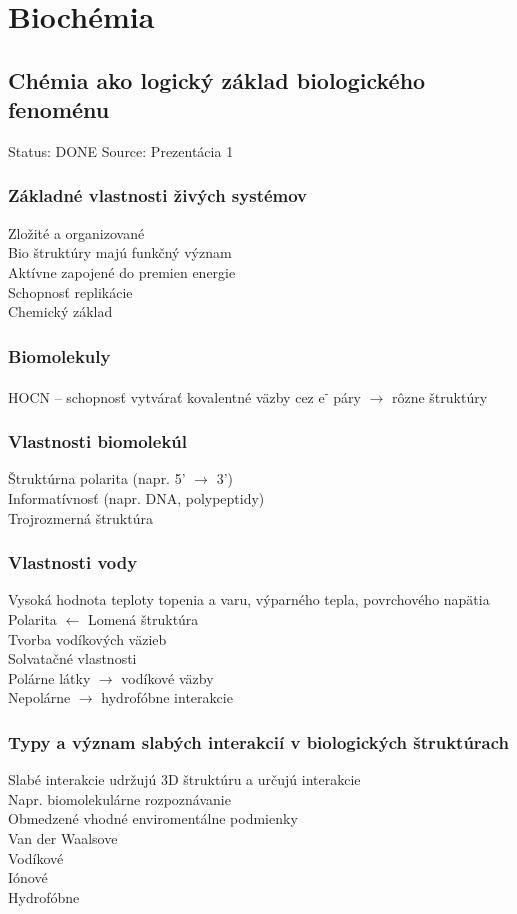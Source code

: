 \newcommand\tab[1][1cm]{\hspace*{#1}}
\chapter[Biochémia]{Biochémia}
\label{biochemia} %

\section{Chémia ako logický základ biologického fenoménu}
Status: DONE
Source: Prezentácia 1
\\
\subsection*{Základné vlastnosti živých systémov}
Zložité a organizované\\
Bio štruktúry majú funkčný význam\\
Aktívne zapojené do premien energie\\
Schopnosť replikácie\\
Chemický základ
\subsection*{Biomolekuly}
HOCN -- schopnosť vytvárať kovalentné väzby cez e\textsuperscript{-} páry $\rightarrow$ rôzne štruktúry
\subsection*{Vlastnosti biomolekúl}
Štruktúrna polarita (napr. 5' $\rightarrow$ 3')\\
Informatívnosť (napr. DNA, polypeptidy)\\
Trojrozmerná štruktúra\\
\subsection*{Vlastnosti vody}
Vysoká hodnota teploty topenia a varu, výparného tepla, povrchového napätia\\
Polarita $\leftarrow$ Lomená štruktúra\\
Tvorba vodíkových väzieb\\
Solvatačné vlastnosti\\
\tab Polárne látky $\rightarrow$ vodíkové väzby\\
\tab Nepolárne $\rightarrow$ hydrofóbne interakcie
\subsection*{Typy a význam slabých interakcií v biologických štruktúrach}
Slabé interakcie udržujú 3D štruktúru a určujú interakcie\\
\tab Napr. biomolekulárne rozpoznávanie\\
\tab Obmedzené vhodné enviromentálne podmienky\\
Van der Waalsove\\
Vodíkové\\
Iónové\\
Hydrofóbne
